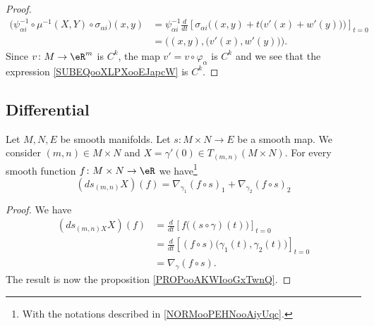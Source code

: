 \begin{proof}
\begin{subequations}
		\begin{align}
			\big( \psi_{\alpha i}^{-1}\circ\mu^{-1}(X,Y)\circ \sigma_{\alpha i} \big)(x,y) & =\psi_{\alpha i}^{-1}\frac{d}{dt} \left[ \sigma_{\alpha i}\Big( (x,y)+t\big( v'(x)+w'(y) \big) \Big)  \right]_{t=0} \\
			                                                                               & =\Big( (x,y),\big( v'(x),w'(y) \big) \Big).		\label{SUBEQooXLPXooEJapcW}
		\end{align}
	\end{subequations}
	Since \(v \colon M\to \eR^m  \) is \( C^k\), the map \( v'=v\circ\varphi_{\alpha}\) is \( C^k\) and we see that the expression \eqref{SUBEQooXLPXooEJapcW} is \( C^k\).
\end{proof}

\subsection{Differential}

\begin{proposition}	\label{PROPooFNVKooVxPulA}
	Let \( M,N,E\) be smooth manifolds. Let \(s \colon M\times N\to E  \) be a smooth map. We consider \( (m,n)\in M\times N\) and \( X=\gamma'(0)\in T_{(m,n)}(M\times N)\). For every smooth function \(f \colon M\times N\to \eR  \) we have\footnote{With the notations described in \ref{NORMooPEHNooAiyUqc}.}
	\begin{equation}
		(ds_{(m,n)}X)(f)=\nabla_{\gamma_1}(f\circ s)_1+\nabla_{\gamma_2}(f\circ s)_2
	\end{equation}
\end{proposition}

\begin{proof}
	We have
	\begin{subequations}
		\begin{align}
			(ds_{(m,n)X}X)(f) & =\frac{d}{dt} \left[ f\big( (s\circ \gamma)(t) \big)  \right]_{t=0}                  \\
			                  & = \frac{d}{dt} \left[   (f\circ s)\big( \gamma_1(t),\gamma_2(t) \big)  \right]_{t=0} \\
			                  & =\nabla_{\gamma}(f\circ s).
		\end{align}
	\end{subequations}
	The result is now the proposition \ref{PROPooAKWIooGxTwnQ}.
\end{proof}



